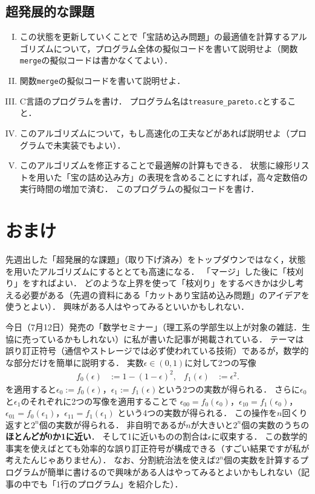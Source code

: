 \documentclass[a4paper,twoside,onecolumn,openany,article]{memoir}
\theoremstyle{remark}
\begin{document}
\subsection{超発展的な課題}
\begin{enumerate}[I.]
\item この状態を更新していくことで「宝詰め込み問題」の最適値を計算するアルゴリズムについて，プログラム全体の擬似コードを書いて説明せよ（関数\texttt{merge}の擬似コードは書かなくてよい）．
\item 関数\texttt{merge}の擬似コードを書いて説明せよ．
\item C言語のプログラムを書け．
プログラム名は\texttt{treasure\_pareto.c}とすること．
\item このアルゴリズムについて，もし高速化の工夫などがあれば説明せよ（プログラムで未実装でもよい）．
\item このアルゴリズムを修正することで最適解の計算もできる．
状態に線形リストを用いた「宝の詰め込み方」の表現を含めることにすれば，高々定数倍の実行時間の増加で済む．
このプログラムの擬似コードを書け．
\end{enumerate}


\section{おまけ}
先週出した「超発展的な課題」（取り下げ済み）をトップダウンではなく，状態を用いたアルゴリズムにするととても高速になる．
「マージ」した後に「枝刈り」をすればよい．
どのような上界を使って「枝刈り」をするべきかは少し考える必要がある（先週の資料にある「カットあり宝詰め込み問題」のアイデアを使うとよい）．
興味がある人はやってみるといいかもしれない．

今日（7月12日）発売の「数学セミナー」（理工系の学部生以上が対象の雑誌．生協に売っているかもしれない）に私が書いた記事が掲載されている．
テーマは誤り訂正符号（通信やストレージでは必ず使われている技術）であるが，数学的な部分だけを簡単に説明する．
実数$\epsilon\in(0,1)$に対して2つの写像
\begin{align*}
f_0(\epsilon) &:=1-(1-\epsilon)^2,&
f_1(\epsilon) &:=\epsilon^2.
\end{align*}
を適用すると$\epsilon_0 := f_0(\epsilon)$，$\epsilon_1 := f_1(\epsilon)$という2つの実数が得られる．
さらに$\epsilon_0$と$\epsilon_1$のそれぞれに2つの写像を適用することで
$\epsilon_{00} = f_0(\epsilon_0)$，$\epsilon_{10}=f_1(\epsilon_0)$， $\epsilon_{01}=f_0(\epsilon_1)$，$\epsilon_{11}=f_1(\epsilon_1)$
という4つの実数が得られる．
この操作を$n$回くり返すと$2^n$個の実数が得られる．
非自明であるが$n$が大きいと$2^n$個の実数のうちの\textbf{ほとんどが0か1に近い}．
そして1に近いものの割合は$\epsilon$に収束する．
この数学的事実を使えばとても効率的な誤り訂正符号が構成できる（すごい結果ですが私が考えたんじゃありません）．
なお、分割統治法を使えば$2^n$個の実数を計算するプログラムが簡単に書けるので興味がある人はやってみるとよいかもしれない（記事の中でも「1行のプログラム」を紹介した）．
\end{document}
